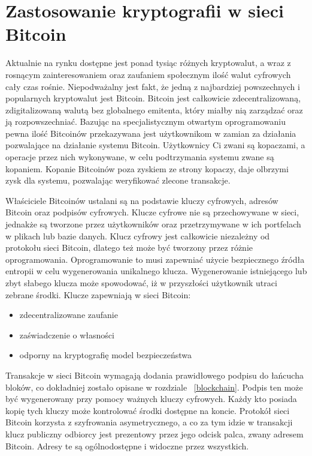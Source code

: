 \documentclass[12pt, twoside, final, openany]{mgr}
\begin{document}
\section{Zastosowanie kryptografii w sieci Bitcoin} \label{sec:zastosowanieKryptografii}
\indent Aktualnie na rynku dostępne jest ponad tysiąc różnych kryptowalut, a wraz z rosnącym zainteresowaniem oraz zaufaniem społecznym ilość walut cyfrowych cały czas rośnie\cite{Zcoinmarketcap}. Niepodważalny jest fakt, że jedną z najbardziej powszechnych i popularnych kryptowalut jest Bitcoin. Bitcoin jest całkowicie zdecentralizowaną, zdigitalizowaną walutą bez globalnego emitenta, który miałby nią zarządzać oraz ją rozpowszechniać. Bazując na specjalistycznym otwartym oprogramowaniu pewna ilość Bitcoinów przekazywana jest użytkownikom w zamian za działania pozwalające na działanie systemu Bitcoin. Użytkownicy Ci zwani są kopaczami, a operacje przez nich wykonywane, w celu podtrzymania systemu zwane są kopaniem. Kopanie Bitcoinów poza zyskiem ze strony kopaczy, daje olbrzymi zysk dla systemu, pozwalając weryfikować zlecone transakcje.

\indent Właściciele Bitcoinów ustalani są na podstawie kluczy cyfrowych, adresów Bitcoin oraz podpisów cyfrowych. Klucze cyfrowe nie są przechowywane w sieci, jednakże są tworzone przez użytkowników oraz przetrzymywane w ich portfelach w plikach lub bazie danych. Klucz cyfrowy jest całkowicie niezależny od protokołu sieci Bitcoin, dlatego też może być tworzony przez różnie oprogramowania. Oprogramowanie to musi zapewniać użycie bezpiecznego źródła entropii w celu wygenerowania unikalnego klucza\cite{Mastering}. Wygenerowanie istniejącego lub zbyt słabego klucza może spowodować, iż w przyszłości użytkownik utraci zebrane środki. Klucze zapewniają w sieci Bitcoin:
\begin{itemize}
\item zdecentralizowane zaufanie
\item zaświadczenie o własności
\item odporny na kryptografię model bezpieczeństwa
\end{itemize}
Transakcje w sieci Bitcoin wymagają dodania prawidłowego podpisu do łańcucha bloków, co dokładniej zostało opisane w rozdziale ~\ref{blockchain}. Podpis ten może być wygenerowany przy pomocy ważnych kluczy cyfrowych. Każdy kto posiada kopię tych kluczy może kontrolować środki dostępne na koncie. Protokół sieci Bitcoin korzysta z szyfrowania asymetrycznego, a co za tym idzie w transakcji klucz publiczny odbiorcy jest prezentowy przez jego odcisk palca, zwany adresem Bitcoin. Adresy te są ogólnodostępne i widoczne przez wszystkich\cite{blockchaininfo}. 
\end{document}
